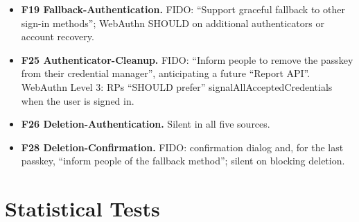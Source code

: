 \documentclass[letterpaper,twocolumn,10pt]{article}
\begin{document}
\begin{itemize}
\item
  \textbf{F19 Fallback-Authentication.} FIDO: ``Support graceful fallback to other sign-in methods''; WebAuthn SHOULD on additional authenticators or account recovery.
\item
  \textbf{F25 Authenticator-Cleanup.} FIDO: ``Inform people to remove the passkey from their credential manager'', anticipating a future ``Report API''. WebAuthn Level 3: RPs ``SHOULD prefer'' signalAllAcceptedCredentials when the user is signed in.
\item
  \textbf{F26 Deletion-Authentication.} Silent in all five sources.
\item
  \textbf{F28 Deletion-Confirmation.} FIDO: confirmation dialog and, for the last passkey, ``inform people of the fallback method''; silent on blocking deletion.
\end{itemize}

\section{Statistical Tests}
\end{document}
